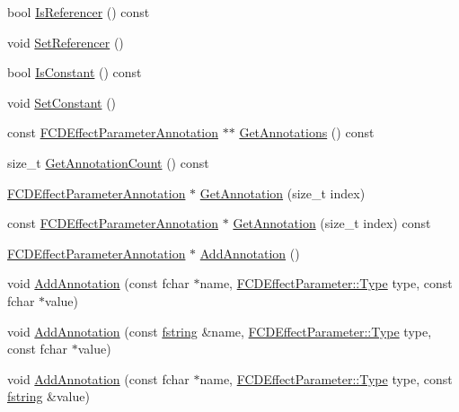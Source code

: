 \begin{DoxyCompactItemize}
\item 
bool \hyperlink{classFCDEffectParameter_aeab23a79f8e23c34c578d3dbeaa15ccb}{IsReferencer} () const 
\item 
void \hyperlink{classFCDEffectParameter_ac583526f7633df0f53eb9b2bcb4cc871}{SetReferencer} ()
\item 
bool \hyperlink{classFCDEffectParameter_abea9fef6b3f53f3517deecf65e48930d}{IsConstant} () const 
\item 
void \hyperlink{classFCDEffectParameter_a9dfd1408c013fc089814ddc8081d717e}{SetConstant} ()
\item 
const \hyperlink{classFCDEffectParameterAnnotation}{FCDEffectParameterAnnotation} $\ast$$\ast$ \hyperlink{classFCDEffectParameter_a6ac54dcbf8d32ba46ef33beb59496a85}{GetAnnotations} () const 
\item 
size\_\-t \hyperlink{classFCDEffectParameter_ab7044a24dc78a4e5bf4521591d0b7c8b}{GetAnnotationCount} () const 
\item 
\hyperlink{classFCDEffectParameterAnnotation}{FCDEffectParameterAnnotation} $\ast$ \hyperlink{classFCDEffectParameter_a1a65ceee576d44bccfc64e1180512a77}{GetAnnotation} (size\_\-t index)
\item 
const \hyperlink{classFCDEffectParameterAnnotation}{FCDEffectParameterAnnotation} $\ast$ \hyperlink{classFCDEffectParameter_ae62a9e58e54ea7430e9de7faae3197a4}{GetAnnotation} (size\_\-t index) const 
\item 
\hyperlink{classFCDEffectParameterAnnotation}{FCDEffectParameterAnnotation} $\ast$ \hyperlink{classFCDEffectParameter_a20bfb0f1361f5712c6014300878996e9}{AddAnnotation} ()
\item 
void \hyperlink{classFCDEffectParameter_a196cbd25ffbbd769276b800b7a557409}{AddAnnotation} (const fchar $\ast$name, \hyperlink{classFCDEffectParameter_a1efe74553d2ed199435085c171743b08}{FCDEffectParameter::Type} type, const fchar $\ast$value)
\item 
void \hyperlink{classFCDEffectParameter_a3e42008248b98e54482a2461cbdcf4da}{AddAnnotation} (const \hyperlink{classfm_1_1stringT}{fstring} \&name, \hyperlink{classFCDEffectParameter_a1efe74553d2ed199435085c171743b08}{FCDEffectParameter::Type} type, const fchar $\ast$value)
\item 
void \hyperlink{classFCDEffectParameter_a94ed87e08db50adcc733b756530a2a06}{AddAnnotation} (const fchar $\ast$name, \hyperlink{classFCDEffectParameter_a1efe74553d2ed199435085c171743b08}{FCDEffectParameter::Type} type, const \hyperlink{classfm_1_1stringT}{fstring} \&value)
\item 
$$
\end{DoxyCompactItemize}

